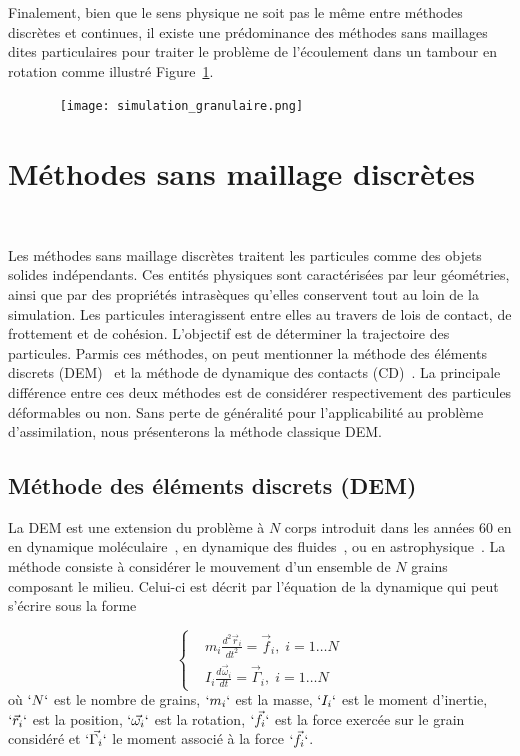Finalement, bien que le sens physique ne soit pas le même entre méthodes discrètes et continues, il existe une prédominance des méthodes sans maillages dites particulaires pour traiter le problème de l'écoulement dans un tambour en rotation comme illustré Figure~\ref{fig:simu_granulaire}.

\begin{figure}~\label{fig:simu_granulaire}
    \texttt{[image: simulation\_granulaire.png]}
\end{figure}

\section{Méthodes sans maillage discrètes}~\label{sec:part_discret}

Les méthodes sans maillage discrètes traitent les particules comme des objets solides indépendants. Ces entités physiques sont caractérisées par leur géométries, ainsi que par des propriétés intrasèques qu'elles conservent tout au loin de la simulation. Les particules interagissent entre elles au travers de lois de contact, de frottement et de cohésion. L'objectif est de déterminer la trajectoire des particules. Parmis ces méthodes, on peut mentionner la méthode des éléments discrets (DEM)~\cite{radjai:hal-00691805} et la méthode de dynamique des contacts (CD)~\cite{moreau:hal-01824750}. La principale différence entre ces deux méthodes est de considérer respectivement des particules déformables ou non. Sans perte de généralité pour l'applicabilité au problème d'assimilation, nous présenterons la méthode classique DEM.

\subsection{Méthode des éléments discrets (DEM)}

La DEM est une extension du problème à $N$ corps introduit dans les années 60 en en dynamique moléculaire~\cite{Alder1959},  en dynamique des fluides~\cite{Allen1987}, ou en astrophysique~\cite{vonHoerner1960}.
La méthode consiste à considérer le mouvement d'un ensemble de $N$ grains composant le milieu. Celui-ci est décrit par l'équation de la dynamique qui peut s'écrire sous la forme

\begin{equation*}
    \left\{
    \begin{aligned}
         & m_{i} \frac{ d^{2}\vec{r}_i }{dt^2}=\vec{f}_{i},\; i=1\ldots N      \\
         & I_{i} \frac{d \vec{\omega}_{i}}{dt}=\vec{\Gamma}_{i},\; i=1\ldots N
    \end{aligned}
    \right.
\end{equation*}où $`N`$ est le nombre de grains, $`m_{i}`$ est la masse, $`I_i`$ est le moment d'inertie, $`\vec{r}_{i}`$ est la position, $`\vec{\omega_{i}}`$ est la rotation, $`\vec{f}_{i}`$ est la force exercée sur le grain considéré et $`\vec{\Gamma_{i}}`$ le moment associé à la force $`\vec{f}_{i}`$.

